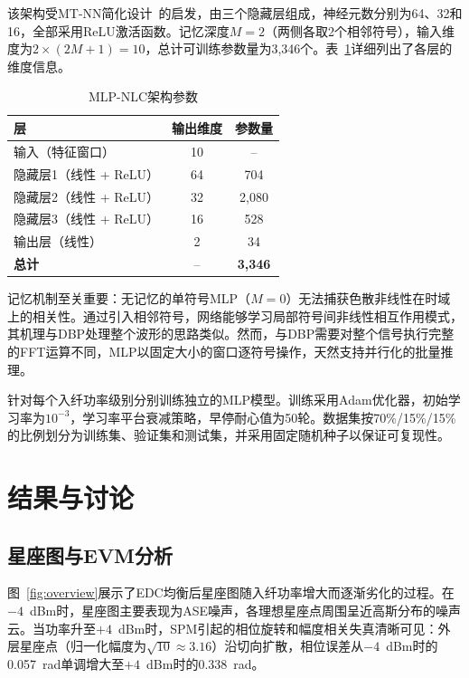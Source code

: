 \documentclass[conference]{IEEEtran}
\begin{document}
该架构受MT-NN简化设计~\cite{mtnn2025}的启发，由三个隐藏层组成，神经元数分别为64、32和16，全部采用ReLU激活函数。记忆深度$M = 2$（两侧各取2个相邻符号），输入维度为$2 \times (2M + 1) = 10$，总计可训练参数量为3,346个。表~\ref{tab:arch}详细列出了各层的维度信息。

\begin{table}[h]
\centering
\caption{MLP-NLC架构参数}
\label{tab:arch}
\begin{tabular}{@{}lcc@{}}
\toprule
\textbf{层} & \textbf{输出维度} & \textbf{参数量} \\
\midrule
输入（特征窗口）  & 10      & -- \\
隐藏层1（线性 + ReLU） & 64     & 704 \\
隐藏层2（线性 + ReLU） & 32     & 2,080 \\
隐藏层3（线性 + ReLU） & 16     & 528 \\
输出层（线性）          & 2      & 34 \\
\midrule
\textbf{总计}           & --     & \textbf{3,346} \\
\bottomrule
\end{tabular}
\end{table}

记忆机制至关重要：无记忆的单符号MLP（$M = 0$）无法捕获色散非线性在时域上的相关性。通过引入相邻符号，网络能够学习局部符号间非线性相互作用模式，其机理与DBP处理整个波形的思路类似。然而，与DBP需要对整个信号执行完整的FFT运算不同，MLP以固定大小的窗口逐符号操作，天然支持并行化的批量推理。

针对每个入纤功率级别分别训练独立的MLP模型。训练采用Adam优化器，初始学习率为$10^{-3}$，学习率平台衰减策略，早停耐心值为50轮。数据集按70\%/15\%/15\%的比例划分为训练集、验证集和测试集，并采用固定随机种子以保证可复现性。

\section{结果与讨论}
\label{sec:results}

\subsection{星座图与EVM分析}

图~\ref{fig:overview}展示了EDC均衡后星座图随入纤功率增大而逐渐劣化的过程。在$-4$~dBm时，星座图主要表现为ASE噪声，各理想星座点周围呈近高斯分布的噪声云。当功率升至$+4$~dBm时，SPM引起的相位旋转和幅度相关失真清晰可见：外层星座点（归一化幅度为$\sqrt{10} \approx 3.16$）沿切向扩散，相位误差从$-4$~dBm时的0.057~rad单调增大至$+4$~dBm时的0.338~rad。
\end{document}
